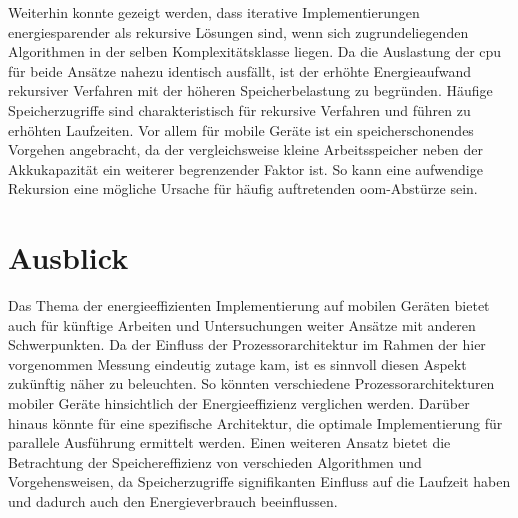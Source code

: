 Weiterhin konnte gezeigt werden, dass iterative Implementierungen energiesparender als rekursive Lösungen sind, wenn sich zugrundeliegenden Algorithmen in der selben Komplexitätsklasse liegen. Da die Auslastung der \ac{cpu} für beide Ansätze nahezu identisch ausfällt, ist der erhöhte Energieaufwand rekursiver Verfahren mit der höheren Speicherbelastung zu begründen. Häufige Speicherzugriffe sind charakteristisch für rekursive Verfahren und führen zu erhöhten Laufzeiten. Vor allem für mobile Geräte ist ein speicherschonendes Vorgehen angebracht, da der vergleichsweise kleine Arbeitsspeicher neben  der Akkukapazität ein weiterer begrenzender Faktor ist. So kann eine aufwendige Rekursion eine mögliche Ursache für häufig auftretenden \ac{oom}-Abstürze sein.



\section{Ausblick}

Das Thema der energieeffizienten Implementierung auf mobilen Geräten bietet auch für künftige Arbeiten und Untersuchungen weiter Ansätze mit anderen Schwerpunkten. Da der Einfluss der Prozessorarchitektur im Rahmen der hier vorgenommen Messung eindeutig zutage kam, ist es sinnvoll diesen Aspekt zukünftig näher zu beleuchten. So könnten verschiedene Prozessorarchitekturen mobiler Geräte hinsichtlich der Energieeffizienz verglichen werden. Darüber hinaus könnte für eine spezifische Architektur, die optimale Implementierung für parallele Ausführung ermittelt werden. Einen weiteren Ansatz bietet die Betrachtung der Speichereffizienz von verschieden Algorithmen und Vorgehensweisen, da Speicherzugriffe signifikanten Einfluss auf die Laufzeit haben und dadurch auch den Energieverbrauch beeinflussen.
